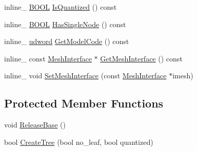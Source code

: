 \begin{DoxyCompactItemize}
\item 
inline\+\_\+ \hyperlink{_ice_types_8h_a050c65e107f0c828f856a231f4b4e788}{B\+O\+O\+L} \hyperlink{class_base_model_a8403c6e8982a6aec5d10615391e5c74f}{Is\+Quantized} () const 
\item 
inline\+\_\+ \hyperlink{_ice_types_8h_a050c65e107f0c828f856a231f4b4e788}{B\+O\+O\+L} \hyperlink{class_base_model_a2bd8daf07f806dd18d248547295673ce}{Has\+Single\+Node} () const 
\item 
inline\+\_\+ \hyperlink{_ice_types_8h_a44c6f1920ba5551225fb534f9d1a1733}{udword} \hyperlink{class_base_model_a70e5ef1ac02803b27ab5ac24ee8fea2f}{Get\+Model\+Code} () const 
\item 
inline\+\_\+ const \hyperlink{class_mesh_interface}{Mesh\+Interface} $\ast$ \hyperlink{class_base_model_a0fb2f7fb04cfa2187e1168d328736c48}{Get\+Mesh\+Interface} () const 
\item 
inline\+\_\+ void \hyperlink{class_base_model_a3ee9dff2e45def7842c8a96133b62c3c}{Set\+Mesh\+Interface} (const \hyperlink{class_mesh_interface}{Mesh\+Interface} $\ast$imesh)
\end{DoxyCompactItemize}
\subsection*{Protected Member Functions}
\begin{DoxyCompactItemize}
\item 
void \hyperlink{class_base_model_ac0b331eda307bebf1c2b0ed568cd0b65}{Release\+Base} ()
\item 
bool \hyperlink{class_base_model_acd802b59a4199af81a6b629c386bd950}{Create\+Tree} (bool no\+\_\+leaf, bool quantized)
\end{DoxyCompactItemize}
